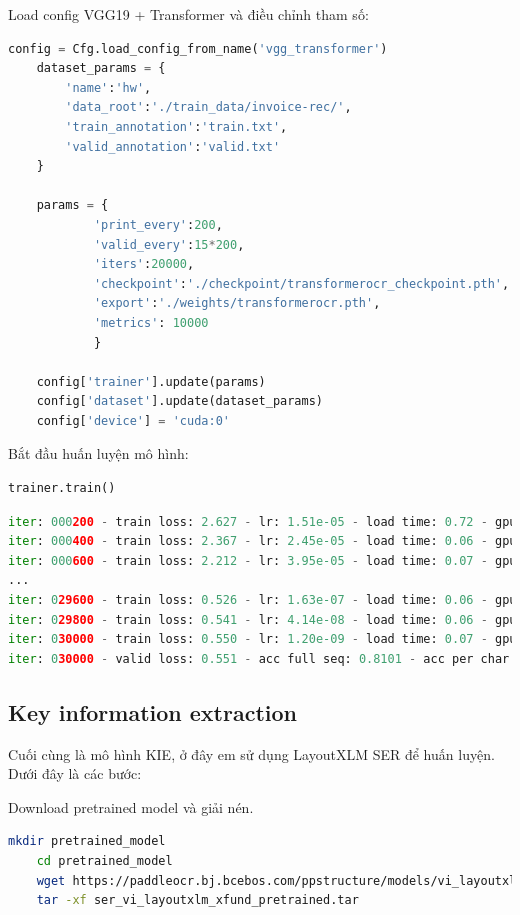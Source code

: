 Load config VGG19 + Transformer và điều chỉnh tham số:
\begin{lstlisting}[language=Python]
    config = Cfg.load_config_from_name('vgg_transformer')
    dataset_params = {
        'name':'hw',
        'data_root':'./train_data/invoice-rec/',
        'train_annotation':'train.txt',
        'valid_annotation':'valid.txt'
    }

    params = {
            'print_every':200,
            'valid_every':15*200,
            'iters':20000,
            'checkpoint':'./checkpoint/transformerocr_checkpoint.pth',    
            'export':'./weights/transformerocr.pth',
            'metrics': 10000
            }

    config['trainer'].update(params)
    config['dataset'].update(dataset_params)
    config['device'] = 'cuda:0'
\end{lstlisting}

Bắt đầu huấn luyện mô hình:
\begin{lstlisting}[language=Python]
    trainer.train()
\end{lstlisting}

\begin{lstlisting}[language=Python]
iter: 000200 - train loss: 2.627 - lr: 1.51e-05 - load time: 0.72 - gpu time: 97.80
iter: 000400 - train loss: 2.367 - lr: 2.45e-05 - load time: 0.06 - gpu time: 91.02
iter: 000600 - train loss: 2.212 - lr: 3.95e-05 - load time: 0.07 - gpu time: 93.54
...
iter: 029600 - train loss: 0.526 - lr: 1.63e-07 - load time: 0.06 - gpu time: 84.60
iter: 029800 - train loss: 0.541 - lr: 4.14e-08 - load time: 0.06 - gpu time: 90.35
iter: 030000 - train loss: 0.550 - lr: 1.20e-09 - load time: 0.07 - gpu time: 90.14
iter: 030000 - valid loss: 0.551 - acc full seq: 0.8101 - acc per char: 0.9543
\end{lstlisting}

\subsection{Key information extraction}
Cuối cùng là mô hình KIE, ở đây em sử dụng LayoutXLM SER để huấn luyện. Dưới đây là các bước:

Download pretrained model và giải nén.
\begin{lstlisting}[language=bash]
    mkdir pretrained_model
    cd pretrained_model
    wget https://paddleocr.bj.bcebos.com/ppstructure/models/vi_layoutxlm/ser_vi_layoutxlm_xfund_pretrained.tar
    tar -xf ser_vi_layoutxlm_xfund_pretrained.tar
\end{lstlisting}


